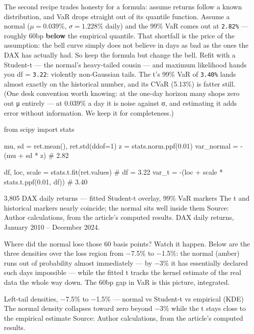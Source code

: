 \documentclass{pyportfolios-note}
\begin{document}
\noteneedroom{190bp}

The second recipe trades honesty for a formula: assume returns follow a known
distribution, and VaR drops straight out of its quantile function. Assume a
normal ($\mu = 0.039\%$, $\sigma = 1.228\%$ daily) and the 99\% VaR comes out at
\texttt{2.82\%} — roughly 60bp \textbf{below} the empirical quantile. That
shortfall is the price of the assumption: the bell curve simply does not believe
in days as bad as the ones the DAX has actually had. So keep the formula but
change the bell. Refit with a Student-t — the normal's heavy-tailed cousin — and
maximum likelihood hands you df = \texttt{3.22}: violently non-Gaussian tails.
The t's 99\% VaR of \texttt{3.40\%} lands almost exactly on the historical
number, and its CVaR (5.13\%) is fatter still. (One desk convention worth
knowing: at the one-day horizon many shops zero out μ entirely — at 0.039\% a
day it is noise against σ, and estimating it adds error without information. We
keep it for completeness.)

\begin{notecode}
from scipy import stats

mu, sd = ret.mean(), ret.std(ddof=1)
z = stats.norm.ppf(0.01)
var_normal = -(mu + sd * z)                     # 2.82%

df, loc, scale = stats.t.fit(ret.values)        # df = 3.22
var_t = -(loc + scale * stats.t.ppf(0.01, df))  # 3.40%
\end{notecode}

  {3,805 DAX daily returns — fitted Student-t overlay, 99\% VaR markers}
  {The t and historical markers nearly coincide; the normal sits well inside
   them}
  {Source: Author calculations, from the article's computed results. DAX daily
   returns, January 2010 – December 2024.}

Where did the normal lose those 60 basis points? Watch it happen. Below are the
three densities over the loss region from −7.5\% to −1.5\%: the normal (amber)
runs out of probability almost immediately — by −3\% it has essentially declared
such days impossible — while the fitted t tracks the kernel estimate of the real
data the whole way down. The 60bp gap in VaR is this picture, integrated.

  {Left-tail densities, −7.5\% to −1.5\% — normal vs Student-t vs empirical (KDE)}
  {The normal density collapses toward zero beyond −3\% while the t stays close
   to the empirical estimate}
  {Source: Author calculations, from the article's computed results.}
\end{document}
